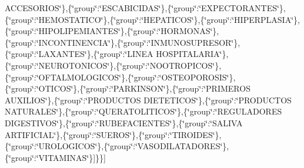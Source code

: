 A\+C\+C\+E\+S\+O\+R\+I\+O\+S\char`\"{}\},\{\char`\"{}group\char`\"{}\+:\char`\"{}\+E\+S\+C\+A\+B\+I\+C\+I\+D\+A\+S\char`\"{}\},\{\char`\"{}group\char`\"{}\+:\char`\"{}\+E\+X\+P\+E\+C\+T\+O\+R\+A\+N\+T\+E\+S\char`\"{}\},\{\char`\"{}group\char`\"{}\+:\char`\"{}\+H\+E\+M\+O\+S\+T\+A\+T\+I\+C\+O\char`\"{}\},\{\char`\"{}group\char`\"{}\+:\char`\"{}\+H\+E\+P\+A\+T\+I\+C\+O\+S\char`\"{}\},\{\char`\"{}group\char`\"{}\+:\char`\"{}\+H\+I\+P\+E\+R\+P\+L\+A\+S\+I\+A\char`\"{}\},\{\char`\"{}group\char`\"{}\+:\char`\"{}\+H\+I\+P\+O\+L\+I\+P\+E\+M\+I\+A\+N\+T\+E\+S\char`\"{}\},\{\char`\"{}group\char`\"{}\+:\char`\"{}\+H\+O\+R\+M\+O\+N\+A\+S\char`\"{}\},\{\char`\"{}group\char`\"{}\+:\char`\"{}\+I\+N\+C\+O\+N\+T\+I\+N\+E\+N\+C\+I\+A\char`\"{}\},\{\char`\"{}group\char`\"{}\+:\char`\"{}\+I\+N\+M\+U\+N\+O\+S\+U\+P\+R\+E\+S\+O\+R\char`\"{}\},\{\char`\"{}group\char`\"{}\+:\char`\"{}\+L\+A\+X\+A\+N\+T\+E\+S\char`\"{}\},\{\char`\"{}group\char`\"{}\+:\char`\"{}\+L\+I\+N\+E\+A H\+O\+S\+P\+I\+T\+A\+L\+A\+R\+I\+A\char`\"{}\},\{\char`\"{}group\char`\"{}\+:\char`\"{}\+N\+E\+U\+R\+O\+T\+O\+N\+I\+C\+O\+S\char`\"{}\},\{\char`\"{}group\char`\"{}\+:\char`\"{}\+N\+O\+O\+T\+R\+O\+P\+I\+C\+O\+S\char`\"{}\},\{\char`\"{}group\char`\"{}\+:\char`\"{}\+O\+F\+T\+A\+L\+M\+O\+L\+O\+G\+I\+C\+O\+S\char`\"{}\},\{\char`\"{}group\char`\"{}\+:\char`\"{}\+O\+S\+T\+E\+O\+P\+O\+R\+O\+S\+I\+S\char`\"{}\},\{\char`\"{}group\char`\"{}\+:\char`\"{}\+O\+T\+I\+C\+O\+S\char`\"{}\},\{\char`\"{}group\char`\"{}\+:\char`\"{}\+P\+A\+R\+K\+I\+N\+S\+O\+N\char`\"{}\},\{\char`\"{}group\char`\"{}\+:\char`\"{}\+P\+R\+I\+M\+E\+R\+O\+S A\+U\+X\+I\+L\+I\+O\+S\char`\"{}\},\{\char`\"{}group\char`\"{}\+:\char`\"{}\+P\+R\+O\+D\+U\+C\+T\+O\+S D\+I\+E\+T\+E\+T\+I\+C\+O\+S\char`\"{}\},\{\char`\"{}group\char`\"{}\+:\char`\"{}\+P\+R\+O\+D\+U\+C\+T\+O\+S N\+A\+T\+U\+R\+A\+L\+E\+S\char`\"{}\},\{\char`\"{}group\char`\"{}\+:\char`\"{}\+Q\+U\+E\+R\+A\+T\+O\+L\+I\+T\+I\+C\+O\+S\char`\"{}\},\{\char`\"{}group\char`\"{}\+:\char`\"{}\+R\+E\+G\+U\+L\+A\+D\+O\+R\+E\+S D\+I\+G\+E\+S\+T\+I\+V\+O\+S\char`\"{}\},\{\char`\"{}group\char`\"{}\+:\char`\"{}\+R\+U\+B\+E\+F\+A\+C\+I\+E\+N\+T\+E\+S\char`\"{}\},\{\char`\"{}group\char`\"{}\+:\char`\"{}\+S\+A\+L\+I\+V\+A A\+R\+T\+I\+F\+I\+C\+I\+A\+L\char`\"{}\},\{\char`\"{}group\char`\"{}\+:\char`\"{}\+S\+U\+E\+R\+O\+S\char`\"{}\},\{\char`\"{}group\char`\"{}\+:\char`\"{}\+T\+I\+R\+O\+I\+D\+E\+S\char`\"{}\},\{\char`\"{}group\char`\"{}\+:\char`\"{}\+U\+R\+O\+L\+O\+G\+I\+C\+O\+S\char`\"{}\},\{\char`\"{}group\char`\"{}\+:\char`\"{}\+V\+A\+S\+O\+D\+I\+L\+A\+T\+A\+D\+O\+R\+E\+S\char`\"{}\},\{\char`\"{}group\char`\"{}\+:\char`\"{}\+V\+I\+T\+A\+M\+I\+N\+A\+S\char`\"{}\}\mbox{]}\}\}\mbox{]}

